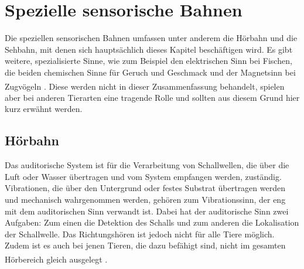
\section{Spezielle sensorische Bahnen}
\label{sec:spezsens}
Die speziellen sensorischen Bahnen umfassen unter anderem die Hörbahn  und die Sehbahn, mit denen sich hauptsächlich dieses Kapitel beschäftigen wird. Es gibt weitere, spezialisierte Sinne, wie zum Beispiel den elektrischen Sinn bei Fischen, die beiden chemischen Sinne für Geruch und Geschmack und der Magnetsinn bei Zugvögeln \textsuperscript{\cite{smith2008biology}}. Diese werden nicht in dieser Zusammenfassung behandelt, spielen aber bei anderen Tierarten eine tragende Rolle und sollten aus diesem Grund hier kurz erwähnt werden.

\subsection{Hörbahn}

Das auditorische System  ist für die Verarbeitung von Schallwellen, die über die Luft oder Wasser übertragen und vom System empfangen werden, zuständig. Vibrationen, die über den Untergrund oder festes Substrat übertragen werden und mechanisch wahrgenommen werden, gehören zum Vibrationssinn, der eng mit dem auditorischen Sinn verwandt ist.
Dabei hat der auditorische Sinn zwei Aufgaben: Zum einen die Detektion des Schalls und zum anderen die Lokalisation der Schallwelle. Das Richtungshören ist jedoch nicht für alle Tiere möglich. Zudem ist es auch bei jenen Tieren, die dazu befähigt sind, nicht im gesamten Hörbereich gleich ausgelegt \textsuperscript{\cite[Kap.~18]{penzlin2005tierphys}}.

